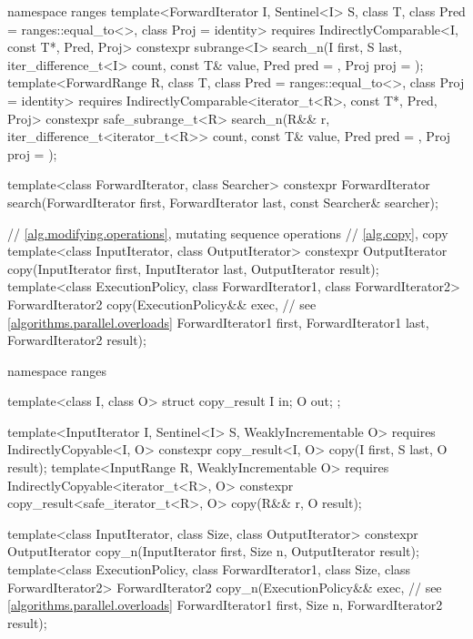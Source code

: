 \begin{codeblock}
{  namespace ranges {
    template<ForwardIterator I, Sentinel<I> S, class T,
             class Pred = ranges::equal_to<>, class Proj = identity>
      requires IndirectlyComparable<I, const T*, Pred, Proj>
      constexpr subrange<I>
        search_n(I first, S last, iter_difference_t<I> count,
                 const T& value, Pred pred = {}, Proj proj = {});
    template<ForwardRange R, class T, class Pred = ranges::equal_to<>,
             class Proj = identity>
      requires IndirectlyComparable<iterator_t<R>, const T*, Pred, Proj>
      constexpr safe_subrange_t<R>
        search_n(R&& r, iter_difference_t<iterator_t<R>> count,
                 const T& value, Pred pred = {}, Proj proj = {});
  }

  template<class ForwardIterator, class Searcher>
    constexpr ForwardIterator
      search(ForwardIterator first, ForwardIterator last, const Searcher& searcher);

  // \ref{alg.modifying.operations}, mutating sequence operations
  // \ref{alg.copy}, copy
  template<class InputIterator, class OutputIterator>
    constexpr OutputIterator copy(InputIterator first, InputIterator last,
                                  OutputIterator result);
  template<class ExecutionPolicy, class ForwardIterator1, class ForwardIterator2>
    ForwardIterator2 copy(ExecutionPolicy&& exec, // see \ref{algorithms.parallel.overloads}
                          ForwardIterator1 first, ForwardIterator1 last,
                          ForwardIterator2 result);

  namespace ranges {
    template<class I, class O>
    struct copy_result {
      I in;
      O out;
    };

    template<InputIterator I, Sentinel<I> S, WeaklyIncrementable O>
      requires IndirectlyCopyable<I, O>
      constexpr copy_result<I, O>
        copy(I first, S last, O result);
    template<InputRange R, WeaklyIncrementable O>
      requires IndirectlyCopyable<iterator_t<R>, O>
      constexpr copy_result<safe_iterator_t<R>, O>
        copy(R&& r, O result);
  }

  template<class InputIterator, class Size, class OutputIterator>
    constexpr OutputIterator copy_n(InputIterator first, Size n,
                                    OutputIterator result);
  template<class ExecutionPolicy, class ForwardIterator1, class Size,
           class ForwardIterator2>
    ForwardIterator2 copy_n(ExecutionPolicy&& exec, // see \ref{algorithms.parallel.overloads}
                            ForwardIterator1 first, Size n,
                            ForwardIterator2 result);

}
\end{codeblock}
